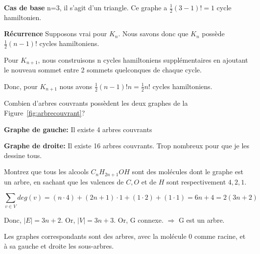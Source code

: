 \textbf{Cas de base} n=3, il s'agit d'un triangle. Ce graphe a $\frac{1}{2}(3-1)! = 1$ cycle hamiltonien.

\textbf{Récurrence} Supposons vrai pour $K_n$. Nous savons donc que $K_n$ possède $\frac{1}{2}(n-1)!$ cycles hamiltoniens. 

Pour $K_{n+1}$, nous construisons n cycles hamiltoniens supplémentaires en ajoutant le nouveau sommet entre 2 sommets quelconques de chaque cycle.

Donc, pour $K_{n+1}$ nous avons $\frac{1}{2}(n-1)!n = \frac{1}{2}n!$ cycles hamiltoniens.



\begin{exo}
Combien d'arbres couvrants poss\`edent les deux graphes de la Figure~\ref{fig:arbrecouvrant}?
\end{exo}



\textbf{Graphe de gauche:} Il existe 4 arbres couvrants

\begin{figure}[!h]
\centering
\scalebox{.825}{}
\end{figure}

\textbf{Graphe de droite:} Il existe 16 arbres couvrants. Trop nombreux pour que je les dessine tous.



\begin{exo}
Montrez que tous les alcools $C_nH_{2n+1}OH$ sont des mol\'ecules dont le graphe est un arbre, en sachant que les valences de $C, O$ et de $H$ sont respectivement $4, 2, 1$.
\end{exo}

\[ \sum_{v\in V} deg(v) = (n\cdot 4) + (2n + 1)\cdot 1 + (1\cdot 2) + (1\cdot 1) = 6n + 4 = 2(3n + 2) \]

Donc, $ |E| = 3n + 2$. Or, $|V| = 3n + 3$. Or, G connexe. $\Rightarrow$ G est un arbre.



Les graphes correspondants sont des arbres, avec la molécule 0 comme racine, et à sa gauche et droite les sous-arbres.

\newpage


